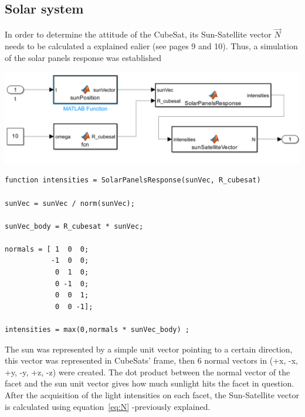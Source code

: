\documentclass[a4paper, 12pt]{article}
\begin{document}
\newpage
\subsection{Solar system}

\begin{minipage}{0.3\textwidth}
In order to determine the attitude of the CubeSat, its Sun-Satellite vector $\vec{N}$ needs to be calculated a explained ealier (see pages 9 and 10). Thus, a simulation of the solar panels response was established 


\end{minipage}
\hfill
\begin{minipage}{0.6\textwidth}
    \centering
    \includegraphics[width=\linewidth]{fig/solarSys.png}
    \label{fig:Solar sensor system on Simulink}
\end{minipage}
\vspace{1cm}
\begin{lstlisting}
function intensities = SolarPanelsResponse(sunVec, R_cubesat)

sunVec = sunVec / norm(sunVec);

sunVec_body = R_cubesat * sunVec;

normals = [ 1  0  0;   
           -1  0  0;  
            0  1  0;   
            0 -1  0;   
            0  0  1;  
            0  0 -1];  

intensities = max(0,normals * sunVec_body) ;

\end{lstlisting}
\vspace{1cm}
The sun was represented by a simple unit vector pointing to a certain direction, this vector was represented in CubeSats' frame, then 6 normal vectors in (+x, -x, +y, -y, +z, -z) were created. The dot product between the normal vector of the facet and the sun unit vector gives how much sunlight hits the facet in question.\\[0.5cm]

After the acquisition of the light intensities on each facet, the Sun-Satellite vector is calculated using equation~\eqref{eq:N} -previously explained.
\end{document}
